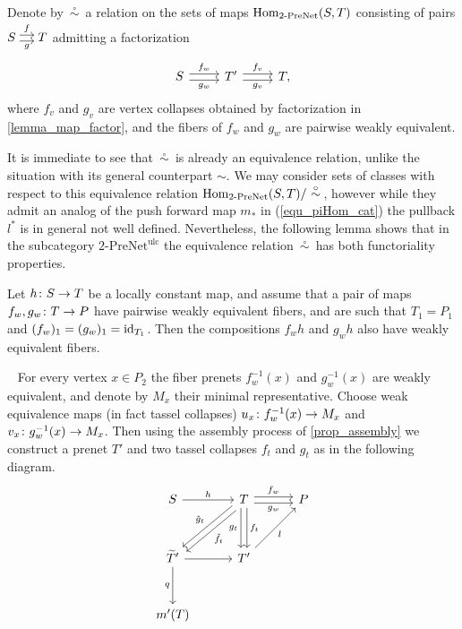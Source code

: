 \documentclass[letterpaper,12pt,leqno]{article}
\numberwithin{equation}{theorem}
\def\PreNet{\textrm{-}\mathrm{PreNet}}
\def\proof{\noindent{\em Proof:}\ }
\def\simo{\,\mathop{\sim}\limits^\circ\,}
\def\ulc{\mathrm{ulc}}
\begin{document}
\begin{definition}
Denote by $\simo$ a relation on the sets of maps $\Hom_{2\PreNet}(S, T)$ consisting of pairs
$\begin{tikzcd}[cramped,sep=small]S \ar[shift left, r, "f"] \ar[shift right, r, "g"'] & T\end{tikzcd}$ admitting a factorization
$$
\begin{tikzcd}
S \ar[shift left, r, "f_w"] \ar[shift right, r, "g_w"'] & T' \ar[shift left, r, "f_v"] \ar[shift right, r, "g_v"'] & T,
\end{tikzcd}
$$
where $f_v$ and $g_v$ are vertex collapses obtained by factorization in \ref{lemma_map_factor}, and the fibers of $f_w$ and $g_w$ are pairwise weakly equivalent.
\end{definition}
It is immediate to see that $\simo$ is already an equivalence relation, unlike the situation with its general counterpart $\sim$. We may consider sets of classes with
respect to this equivalence relation $\Hom_{2\PreNet}(S, T) / \simo$, however while they admit an analog of the push forward map $m_*$ in (\ref{equ_piHom_cat}) the pullback $l^*$ is in general not well defined.
Nevertheless, the following lemma shows that in the subcategory $2\PreNet^\ulc$ the equivalence relation $\simo$ has both functoriality properties.

\begin{lemma}
\label{lemma_lc_equiv}
Let $h\colon S \to T$ be a locally constant map, and assume that a pair of maps $f_w, g_w\colon T \to P$ have pairwise weakly equivalent fibers, and are such that $T_1 = P_1$ and $(f_w)_1 = (g_w)_1 = \mathrm{id}_{T_1}$.
Then the compositions $f_w h$ and $g_w h$ also have weakly equivalent fibers.
\end{lemma}
\proof
For every vertex $x \in P_2$ the fiber prenets $f_w^{-1}(x)$ and $g_w^{-1}(x)$ are weakly equivalent, and denote by $M_x$ their minimal representative. Choose weak equivalence maps (in fact tassel collapses)
$u_x\colon f_w^{-1}(x) \to M_x$ and $v_x\colon g_w^{-1}(x) \to M_x$. Then using the assembly process of \ref{prop_assembly} we construct a prenet $T'$ and two tassel collapses $f_t$ and $g_t$ as in the following
diagram.
$$
\begin{tikzcd}[sep=3em]
S \ar[r, "h"] & T \ar[shift left, dl, "\tilde f_t"] \ar[shift right, dl, "\tilde g_t"'] \ar[shift left, d, "f_t"] \ar[shift right, d, "g_t"'] \ar[shift left, r, "f_w"] \ar[shift right, r, "g_w"'] & P \\
\wtilde T' \ar[d, "q"'] \ar[r] & T' \ar[ur, "l"'] & \\
m'(T) & &
\end{tikzcd}
$$
\end{document}
